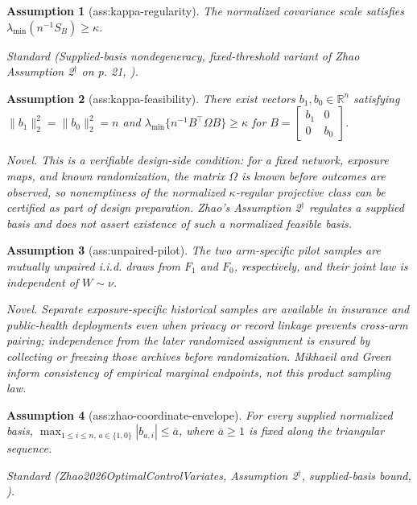 \documentclass{article}
\newtheorem{assumption}{Assumption}
\begin{document}
\begin{assumption}[ass:kappa-regularity]\label{ass:kappa-regularity}
The normalized covariance scale satisfies \(\lambda_{\min}(n^{-1}S_B)\ge\kappa\).
\par\smallskip\noindent\emph{Standard} (Supplied-basis nondegeneracy, fixed-threshold variant of Zhao Assumption 2\(^{\dagger}\) on p. 21, \cite{Zhao2026OptimalControlVariates}).
\end{assumption}

\begin{assumption}[ass:kappa-feasibility]\label{ass:kappa-feasibility}
There exist vectors \(b_1,b_0\in\mathbb R^n\) satisfying \(\lVert b_1\rVert_2^2=\lVert b_0\rVert_2^2=n\) and \(\lambda_{\min}\{n^{-1}B^{\top}\Omega B\}\ge\kappa\) for \(B=\begin{bmatrix}b_1&0\\0&b_0\end{bmatrix}\).
\par\smallskip\noindent\emph{Novel.} This is a verifiable design-side condition: for a fixed network, exposure maps, and known randomization, the matrix \(\Omega\) is known before outcomes are observed, so nonemptiness of the normalized \(\kappa\)-regular projective class can be certified as part of design preparation. Zhao's Assumption 2\(^{\dagger}\) regulates a supplied basis and does not assert existence of such a normalized feasible basis.
\end{assumption}

\begin{assumption}[ass:unpaired-pilot]\label{ass:unpaired-pilot}
The two arm-specific pilot samples are mutually unpaired i.i.d. draws from \(F_1\) and \(F_0\), respectively, and their joint law is independent of \(W\sim\nu\).
\par\smallskip\noindent\emph{Novel.} Separate exposure-specific historical samples are available in insurance and public-health deployments even when privacy or record linkage prevents cross-arm pairing; independence from the later randomized assignment is ensured by collecting or freezing those archives before randomization. Mikhaeil and Green inform consistency of empirical marginal endpoints, not this product sampling law.
\end{assumption}

\begin{assumption}[ass:zhao-coordinate-envelope]\label{ass:zhao-coordinate-envelope}
For every supplied normalized basis, \(\max_{1\le i\le n,\,a\in\{1,0\}}|b_{a,i}|\le\overline a\), where \(\overline a\ge1\) is fixed along the triangular sequence.
\par\smallskip\noindent\emph{Standard} (Zhao2026OptimalControlVariates, Assumption 2\(^{\dagger}\), supplied-basis bound, \cite{Zhao2026OptimalControlVariates}).
\end{assumption}
\end{document}
